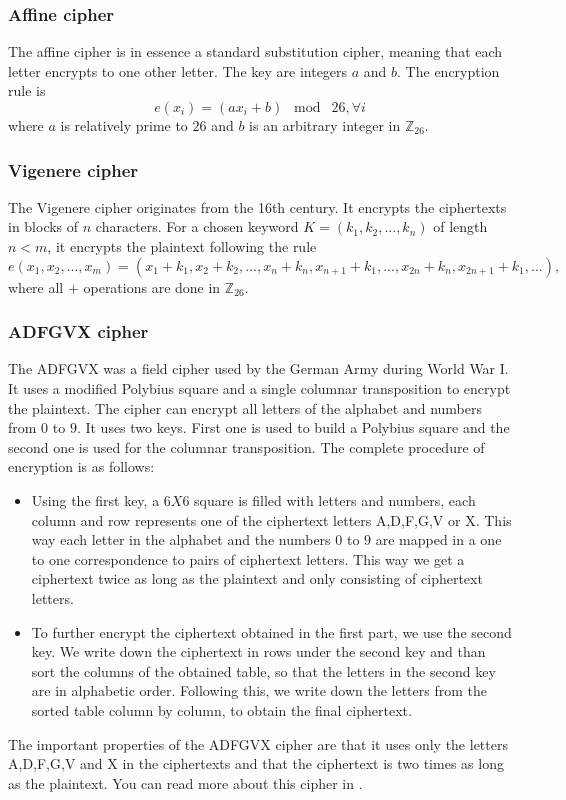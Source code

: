 \documentclass[a4paper]{article}
\begin{document}
\subsubsection{Affine cipher}
The affine cipher is in essence a standard substitution cipher, meaning that each letter encrypts to one other letter. The key are integers $a$ and $b$. The encryption rule is
$$e(x_{i}) = (ax_{i} + b) \;\bmod\; 26, \forall i$$
where $a$ is relatively prime to $26$ and $b$ is an arbitrary integer in $\mathbb{Z}_{26}$.


\subsubsection{Vigenere cipher}
The Vigenere cipher originates from the 16th century. It encrypts the ciphertexts in blocks of $n$ characters. For a chosen keyword $K = (k_{1}, k_{2}, ..., k_{n})$ of length $n < m$, it encrypts the plaintext following the rule
$$e(x_{1}, x_{2}, ...,x_{m}) = (x_{1}+k_{1}, x_{2}+k_{2}, ..., x_{n}+k_{n}, x_{n+1}+k_{1}, ...,x_{2n}+k_{n}, x_{2n+1} + k_{1}, ...),$$
where all $+$ operations are done in $\mathbb{Z}_{26}$.

\subsubsection{ADFGVX cipher}
The ADFGVX was a field cipher used by the German Army during World War I. It uses a modified Polybius square and a single columnar transposition to encrypt the plaintext. The cipher can encrypt all letters of the alphabet and numbers from $0$ to $9$. It uses two keys. First one is used to build a Polybius square and the second one is used for the columnar transposition. The complete procedure of encryption is as follows:
\begin{itemize}
	\item Using the first key, a $6X6$ square is filled with letters and numbers, each column and row represents one of the ciphertext letters A,D,F,G,V or X. This way each letter in the alphabet and the numbers $0$ to $9$ are mapped in a one to one correspondence to pairs of ciphertext letters. This way we get a ciphertext twice as long as the plaintext and only consisting of ciphertext letters.
	\item To further encrypt the ciphertext obtained in the first part, we use the second key. We write down the ciphertext in rows under the second key and than sort the columns of the obtained table, so that the letters in the second key are in alphabetic order. Following this, we write down the letters from the sorted table column by column, to obtain the final ciphertext.
\end{itemize} 
The important properties of the ADFGVX cipher are that it uses only the letters A,D,F,G,V and X in the ciphertexts and that the ciphertext is two times as long as the plaintext. You can read more about this cipher in \cite{practicalCrypto}.
\end{document}
